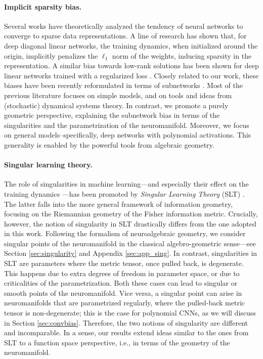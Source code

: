 \documentclass{article} %
\theoremstyle{plain}%
\theoremstyle{definition}
\theoremstyle{remark}
\begin{document}
\paragraph{Implicit sparsity bias.} Several works have theoretically analyzed the tendency of neural networks to converge to sparse data representations. A line of research \citep{woodworth2020kernel, nacson2022implicit,pesme2021implicit, andriushchenko2023sgd} has shown that, for deep diagonal linear networks, the training dynamics, when initialized around the origin, implicitly penalizes the $\ell_1$ norm of the weights, inducing sparsity in the representation. A similar bias towards low-rank solutions has been shown for deep linear networks trained with a regularized loss \citep{kunin2019loss, ziyin2022exact, wang2023implicit}. Closely related to our work, these biases have been recently reformulated in terms of subnetworks \citep{chen2023stochastic}. Most of the previous literature focuses on simple models, and  on tools and ideas from (stochastic) dynamical systems theory. In contrast, we promote a purely geometric perspective, explaining the subnetwork bias in terms of the singularities and the parametrization of the neuromanifold. Moreover, we focus on general models--specifically, deep networks with polynomial activations. This generality is enabled by the powerful tools from algebraic geometry.    


\paragraph{Singular learning theory.} The role of singularities in machine learning---and especially their effect on the training dynamics \citep{amari2006singularities,wei2008dynamics}---has been promoted by \emph{Singular Learning Theory} (SLT) \citep{watanabe2009algebraic, watanabe2007almost, amari2003learning, wei2022deep}. The latter falls into the more general framework of information geometry, focusing on the Riemannian geometry of the Fisher information metric. Crucially, however, the notion of singularity in SLT drastically differs from the one adopted in this work. Following the formalism of neuroalgebraic geometry, we consider singular points of the neuromanifold in the classical algebro-geometric sense---see Section \ref{sec:singularity} and Appendix \ref{sec:app_sing}. In contrast, singularities in SLT are parameters where the metric tensor, once pulled back, is degenerate. This happens due to extra degrees of freedom in parameter space, or due to criticalities of the parametrization. Both these cases can lead to singular or smooth points of the neuromanifold. Vice versa, a singular point can arise in neuromanifolds that are parametrized regularly, where the pulled-back metric tensor is non-degenerate; this is the case for polynomial CNNs, as we will discuss in Section \ref{sec:convbias}. Therefore, the two notions of singularity are different and incomparable. In a sense, our results extend ideas similar to the ones from SLT to a function space perspective, i.e., in terms of the geometry of the neuromanifold. 
\end{document}
